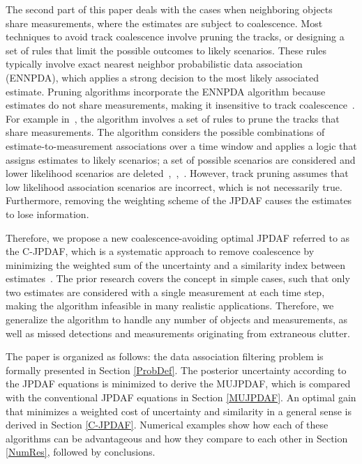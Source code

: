 \documentclass[letterpaper, 10pt, conference]{ieeeconf}
\begin{document}
The second part of this paper deals with the cases when neighboring objects share measurements, where the estimates are subject to coalescence.
Most techniques to avoid track coalescence involve pruning the tracks, or designing a set of rules that limit the possible outcomes to likely scenarios. These rules typically involve exact nearest neighbor probabilistic data association (ENNPDA), which applies a strong decision to the most likely associated estimate. Pruning algorithms incorporate the ENNPDA algorithm because  estimates do not share measurements, making it insensitive to track coalescence~\cite{Coal1}.
For example in~\cite{Fitzgerald}, the algorithm involves a set of rules to prune the tracks that share measurements.
The algorithm considers the possible combinations of estimate-to-measurement associations over a time window and applies a logic that assigns estimates to likely scenarios; a set of possible scenarios are considered and lower likelihood scenarios are deleted~\cite{Coal_d},~\cite{Coal_e},~\cite{Coal_c}.
However, track pruning assumes that low likelihood association scenarios are incorrect, which is not necessarily true.
Furthermore, removing the weighting scheme of the JPDAF causes the estimates to lose information.

Therefore, we propose a new coalescence-avoiding optimal JPDAF referred to as the C-JPDAF, which is a systematic approach to remove coalescence by minimizing the weighted sum of the uncertainty and a similarity index between estimates~\cite{KauLovLee14}.
The prior research covers the concept in simple cases, such that only two estimates are considered with a single measurement at each time step, making the algorithm infeasible in many realistic applications.
Therefore, we generalize the algorithm to handle any number of objects and measurements, as well as missed detections and measurements originating from extraneous clutter.

The paper is organized as follows: the data association filtering problem is formally presented in Section \ref{ProbDef}.
The posterior uncertainty according to the JPDAF equations is minimized to derive the MUJPDAF, which is compared with the conventional JPDAF equations in Section \ref{MUJPDAF}.
An optimal gain that minimizes a weighted cost of uncertainty and similarity in a general sense is derived in Section \ref{C-JPDAF}.
Numerical examples show how each of these algorithms can be advantageous and how they compare to each other in Section \ref{NumRes}, followed by conclusions.
\end{document}

